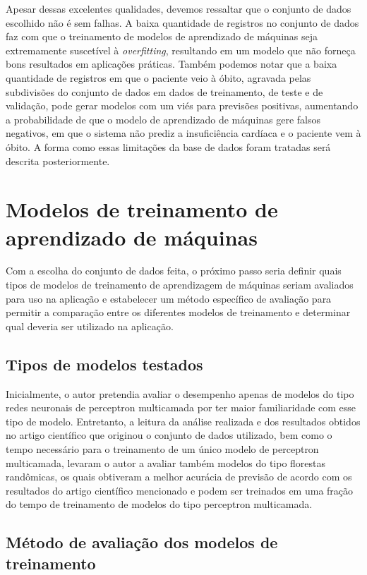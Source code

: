 Apesar dessas excelentes qualidades, devemos ressaltar que o conjunto de dados escolhido não é sem falhas. A baixa quantidade de registros no conjunto de dados faz com que o treinamento de modelos de aprendizado de máquinas seja extremamente suscetível à \textit{overfitting}, resultando em um modelo que não forneça bons resultados em aplicações práticas. Também podemos notar que a baixa quantidade de registros em que o paciente veio à óbito, agravada pelas subdivisões do conjunto de dados em dados de treinamento, de teste e de validação, pode gerar modelos com um viés para previsões positivas, aumentando a probabilidade de que o modelo de aprendizado de máquinas gere falsos negativos, em que o sistema não prediz a insuficiência cardíaca e o paciente vem à óbito. A forma como essas limitações da base de dados foram tratadas será descrita posteriormente.

\section{Modelos de treinamento de aprendizado de máquinas}

Com a escolha do conjunto de dados feita, o próximo passo seria definir quais tipos de modelos de treinamento de aprendizagem de máquinas seriam avaliados para uso na aplicação e estabelecer um método específico de avaliação para permitir a comparação entre os diferentes modelos de treinamento e determinar qual deveria ser utilizado na aplicação.

\subsection{Tipos de modelos testados}

Inicialmente, o autor pretendia avaliar o desempenho apenas de modelos do tipo redes neuronais de perceptron multicamada por ter maior familiaridade com esse tipo de modelo. Entretanto, a leitura da análise realizada e dos resultados obtidos no artigo científico\cite{chicco2020} que originou o conjunto de dados utilizado\cite{larxel_dataset}, bem como o tempo necessário para o treinamento de um único modelo de perceptron multicamada, levaram o autor a avaliar também modelos do tipo florestas randômicas, os quais obtiveram a melhor acurácia de previsão de acordo com os resultados do artigo científico mencionado e podem ser treinados em uma fração do tempo de treinamento de modelos do tipo perceptron multicamada.

\subsection{Método de avaliação dos modelos de treinamento}

